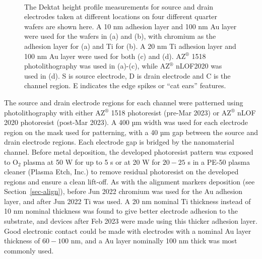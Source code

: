\documentclass[
  a4paper,
]{scrbook}
\begin{document}
\begin{figure}
\begin{minipage}[t]{0.45\linewidth}
{{}

}

\end{minipage}%
%
\begin{minipage}[t]{0.01\linewidth}

{\centering 

~

}

\end{minipage}%

\caption[The Dektat height profile measurements for source and drain
electrodes taken at different locations on four different quarter
wafers.]{\label{fig-electrodes-dektat}The Dektat height profile
measurements for source and drain electrodes taken at different
locations on four different quarter wafers are shown here. A 10 nm
adhesion layer and 100 nm Au layer were used for the wafers in (a) and
(b), with chromium as the adhesion layer for (a) and Ti for (b). A 20 nm
Ti adhesion layer and 100 nm Au layer were used for both (c) and (d).
AZ\(^\circledR\) 1518 photolithography was used in (a)-(c), while
AZ\(^\circledR\) nLOF2020 was used in (d). S is source electrode, D is
drain electrode and C is the channel region. E indicates the edge spikes
or ``cat ears'' features.}

\end{figure}

The source and drain electrode regions for each channel were patterned
using photolithography with either AZ\(^\circledR\) 1518 photoresist
(pre-Mar 2023) or AZ\(^\circledR\) nLOF 2020 photoresist (post-Mar
2023). A 400 µm width was used for each electrode region on the mask
used for patterning, with a 40 µm gap between the source and drain
electrode regions. Each electrode gap is bridged by the nanomaterial
channel. Before metal deposition, the developed photoresist pattern was
exposed to O\(_2\) plasma at 50 W for up to 5 s or at 20 W for \(20-25\)
s in a PE-50 plasma cleaner (Plasma Etch, Inc.) to remove residual
photoresist on the developed regions and ensure a clean lift-off. As
with the alignment markers deposition (see Section~\ref{sec-align}),
before Jun 2022 chromium was used for the Au adhesion layer, and after
Jun 2022 Ti was used. A 20 nm nominal Ti thickness instead of 10 nm
nominal thickness was found to give better electrode adhesion to the
substrate, and devices after Feb 2023 were made using this thicker
adhesion layer. Good electronic contact could be made with electrodes
with a nominal Au layer thickness of \(60-100\) nm, and a Au layer
nominally 100 nm thick was most commonly used.
\end{document}
